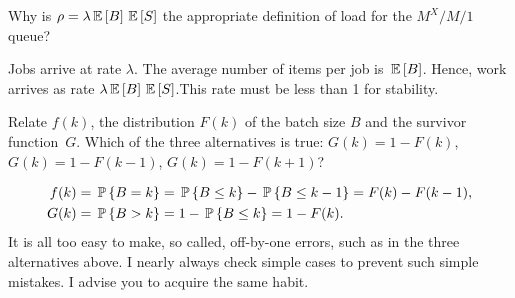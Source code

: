 \begin{question}
  Why is $\rho = \lambda \E B \E S$ the appropriate definition
  of load for the $M^X/M/1$ queue?
  \begin{solution}
    Jobs arrive at rate $\lambda$. The average number of items per job
    is $\E B$. Hence, work arrives as rate $\lambda \E B \E S$.This
    rate must be less than 1 for stability.
  \end{solution}
\end{question}

\begin{question}
  Relate $f(k)$, the distribution $F(k)$ of the batch size $B$ and the
  survivor function~$G$. Which of the three alternatives is true:
  $G(k) = 1-F(k)$, $G(k) = 1-F(k-1)$, $G(k) = 1-F(k+1)$?
  \begin{solution}
    \begin{align*}
    f(k) &= \P{B=k} = \P{B\leq k} - \P{B\leq k-1} = F(k)-F(k-1), \\
    G(k) &= \P{B>k} = 1 - \P{B\leq k} = 1-F(k).        
    \end{align*}
    It is all too easy to make, so called, off-by-one errors, such as
    in the three alternatives above.  I nearly always check simple
    cases to prevent such simple mistakes. I advise you to acquire the
    same habit.
  \end{solution}
\end{question}

